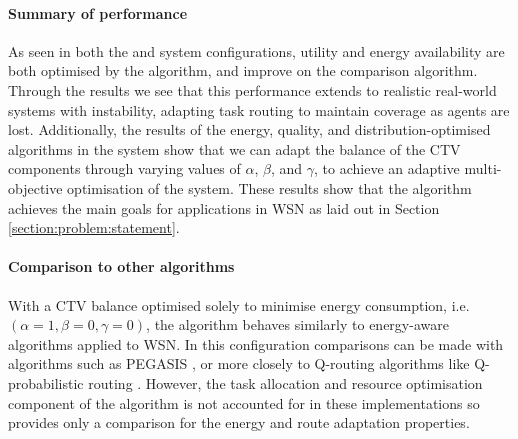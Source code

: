 \paragraph{Summary of performance}

As seen in both the \simulationSimple{}{}  and \simulationNodeFailure{}{} system configurations, utility and energy availability are both optimised by the algorithm, and improve on the comparison \algorithmBaseline{}{} algorithm. Through the \simulationNodeFailure{}{} results we see that this performance extends to realistic real-world systems with instability, adapting task routing to maintain coverage as agents are lost.  Additionally, the results of the \acronymWSNOptimisation{}{} energy, quality, and distribution-optimised algorithms in the \simulationExtended{}{} system show that we can adapt the balance of the CTV components through varying values of $\alpha$, $\beta$, and $\gamma$, to achieve an adaptive multi-objective optimisation of the system. These results show that the algorithm achieves the main goals for applications in WSN as laid out in Section \ref{section:problem:statement}.

\paragraph{Comparison to other algorithms}
With a CTV balance optimised solely to minimise energy consumption, i.e. $(\alpha=1,\beta=0,\gamma=0)$, the \acronymWSNOptimisation{}{} algorithm behaves similarly to energy-aware algorithms applied to WSN. In this configuration comparisons can be made with algorithms such as PEGASIS \citep{Lindsey2002}, or more closely to Q-routing algorithms like Q-probabilistic routing \citep{Arroyo-Valles2007}. However, the task allocation and resource optimisation component of the \acronymWSNOptimisation{}{} algorithm is not accounted for in these implementations so provides only a comparison for the energy and route adaptation properties. 
